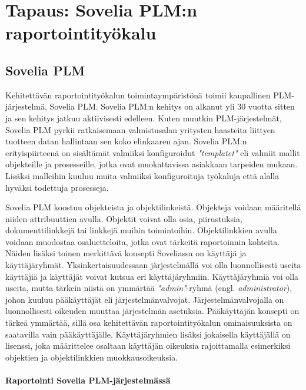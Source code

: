 \chapter{Tapaus: Sovelia PLM:n raportointityökalu} \label{Tapaus: Sovelia PLM:n raportointityökalu}

\section{Sovelia PLM} \label{Sovelia PLM}

Kehitettävän raportointityökalun toimintaympäristönä toimii kaupallinen PLM-järjestelmä, Sovelia PLM. Sovelia PLM:n kehitys on alkanut yli 30 vuotta sitten ja sen kehitys jatkuu aktiivisesti edelleen. Kuten muutkin PLM-järjestelmät, Sovelia PLM pyrkii ratkaisemaan valmistusalan yritysten haasteita liittyen tuotteen datan hallintaan sen koko elinkaaren ajan. \cite{soveliaAboutSovelia} Sovelia PLM:n erityispiirteenä on sisältämät valmiiksi konfiguroidut \textit{"templatet"} eli valmiit mallit objekteille ja prosesseille, jotka ovat muokattavissa asiakkaan tarpeiden mukaan. Lisäksi malleihin kuuluu muita valmiiksi konfiguroituja työkaluja että alalla hyväksi todettuja prosesseja. \cite{soveliaSoveliaGetting}

Sovelia PLM koostuu objekteista ja objektilinkeistä. Objekteja voidaan määritellä niiden attribuuttien avulla. Objektit voivat olla osia, piirustuksia, dokumenttilinkkejä tai linkkejä muihin toimintoihin. \cite{soveliaSoveliaGetting} Objektilinkkien avulla voidaan muodostaa osaluetteloita, jotka ovat tärkeitä raportoinnin kohteita. Näiden lisäksi toinen merkittävä konsepti Soveliassa on käyttäjä ja käyttäjäryhmät. Yksinkertaisuudessaan järjestelmällä voi olla luonnollisesti useita käyttäjiä ja käyttäjät voivat kutsua eri käyttäjäryhmiin. Käyttäjäryhmiä voi olla useita, mutta tärkein niistä on ymmärtää \textit{"admin"}-ryhmä (engl. \textit{administrator}), johon kuuluu pääkäyttäjät eli järjestelmänvalvojat. Järjestelmänvalvojalla on luonnollisesti oikeuden muuttaa järjestelmän asetuksia. Pääkäyttäjän konsepti on tärkeä ymmärtää, sillä osa kehitettävän raportointityökalun ominaisuuksista on saatavilla vain pääkäyttäjälle. Käyttäjäryhmien lisäksi jokaisella käyttäjällä on lisenssi, joka määrittelee osaltaan käyttäjän oikeuksia rajoittamalla esimerkiksi objektien ja objektilinkkien muokkausoikeuksia. \cite{soveliaUserManagement}

\subsubsection{Raportointi Sovelia PLM-järjestelmässä} \label{Raportointi Sovelia}

